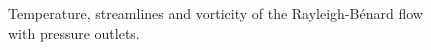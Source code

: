\begin{figure}[t]
	\centering
	\pgfplotsset{width=0.96\textwidth, compat=1.3}
	\par\bigskip%
	\par\bigskip%
	\caption{Temperature, streamlines and vorticity of the Rayleigh-Bénard flow with pressure outlets.}\label{fig:RayBerUnsteadySol}
\end{figure}
\FloatBarrier